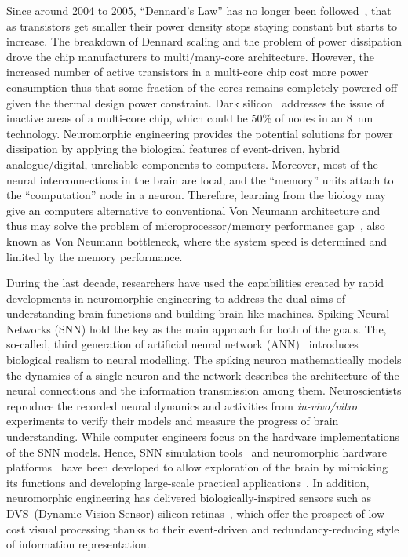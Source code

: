 Since around 2004 to 2005, ``Dennard's Law'' has no longer been followed~\cite{bohr200730}, that as transistors get smaller their power density stops staying constant but starts to increase.
The breakdown of Dennard scaling and the problem of power dissipation drove the chip manufacturers to multi/many-core architecture.
However, the increased number of active transistors in a multi-core chip cost more power consumption thus that some fraction of the cores remains completely powered-off given the thermal design power constraint.
Dark silicon~\cite{esmaeilzadeh2011dark} addresses the issue of inactive areas of a multi-core chip, which could be 50\% of nodes in an 8~nm technology.
Neuromorphic engineering provides the potential solutions for power dissipation by applying the biological features of event-driven, hybrid analogue/digital, unreliable components to computers.
Moreover, most of the neural interconnections in the brain are local, and the ``memory'' units attach to the ``computation'' node in a neuron.
Therefore, learning from the biology may give an computers alternative to conventional Von Neumann architecture and thus may solve the problem of microprocessor/memory performance gap~\cite{wulf1995hitting}, also known as Von Neumann bottleneck, where the system speed is determined and limited by the memory performance.



During the last decade, researchers have used the capabilities created by rapid developments in neuromorphic engineering to address the dual aims of understanding brain functions and building brain-like machines.
Spiking Neural Networks (SNN) hold the key as the main approach for both of the goals.
The, so-called, third generation of artificial neural network (ANN)~\cite{maass1997networks} introduces biological realism to neural modelling.
The spiking neuron mathematically models the dynamics of a single neuron and the network describes the architecture of the neural connections and the information transmission among them.
Neuroscientists reproduce the recorded neural dynamics and activities from \textit{in-vivo/vitro} experiments to verify their models and measure the progress of brain understanding.
While computer engineers focus on the hardware implementations of the SNN models.
Hence, SNN simulation tools~\cite{davison2008pynn, gewaltig2007nest, goodman2008brian} and neuromorphic hardware platforms~\cite{furber2014spinnaker,  schemmel2010wafer,benjamin2014neurogrid,merolla2014million} have been developed to allow exploration of the brain by mimicking its functions and developing large-scale practical applications~\cite{eliasmith2012large}.
In addition, neuromorphic engineering has delivered biologically-inspired sensors such as DVS~(Dynamic Vision Sensor) silicon retinas~\cite{serrano2013128, delbruck2008frame, yang2015dynamic, posch2014retinomorphic}, which offer the prospect of low-cost visual processing thanks to their event-driven and redundancy-reducing style of information representation.

